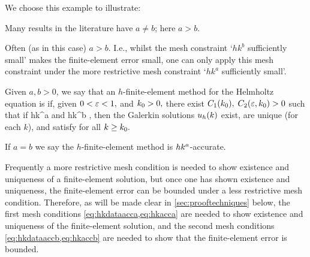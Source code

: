 We choose this example to illustrate:
\bit
\item Many results in the literature have $a \neq b$; here $a > b.$
\item Often (as in this case) $a > b.$ I.e., whilst the mesh constraint `$hk^b$ sufficiently small' makes the finite-element error small, one can only apply this mesh constraint under the more restrictive mesh constraint `$hk^a$ sufficiently small'.
\eit
\ere

\bde[$\hk{a}{b}$-accurate]\label{def:hkacc}
Given $a,b>0$, we say that an $h$-finite-element method for the Helmholtz equation is  if, given $0 < \varepsilon < 1,$ and $k_{0} > 0,$ there exist $C_{1}(k_{0}),$ $C_{2}(\varepsilon,k_{0}) > 0$ such that if
\beq\label{eq:hkacca}
hk^a \leq \Co
\eeq
and
\beq\label{eq:hkaccb}
hk^b \leq \Ct,
\eeq
then the Galerkin solutions $u_{h}(k)$ exist, are unique (for each $k$), and satisfy
\beq\label{eq:hkacc}
 \leq \eps
\eeq
for all $k \geq k_{0}.$

If $a=b$ we say the $h$-finite-element method is $hk^{a}$-accurate.
\ede

Frequently a more restrictive mesh condition is needed to show existence and uniqueness of a finite-element solution, but once one has shown existence and uniqueness, the finite-element error can be bounded under a less restrictive mesh condition. Therefore, as will be made clear in \cref{sec:prooftechniques} below, the first mesh conditions \cref{eq:hkdataacca,eq:hkacca} are needed to show existence and uniqueness of the finite-element solution, and the second mesh conditions \cref{eq:hkdataaccb,eq:hkaccb} are needed to show that the finite-element error is bounded.
\ere

